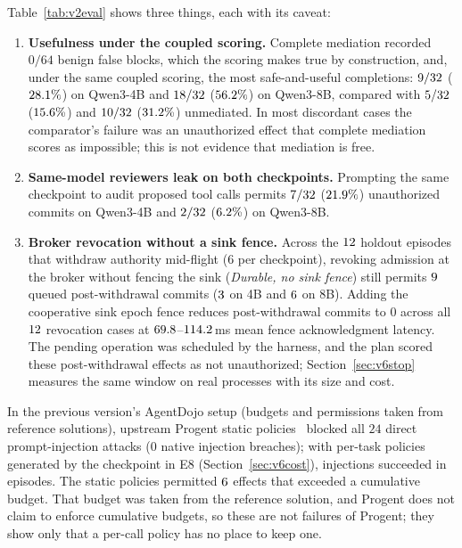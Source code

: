 Table~\ref{tab:v2eval} shows three things, each with its caveat:
\begin{enumerate}
  \item \textbf{Usefulness under the coupled scoring.} Complete mediation recorded \(0/64\) benign false blocks, which the scoring makes true by construction, and, under the same coupled scoring, the most safe-and-useful completions: \(9/32\) (\(28.1\%\)) on Qwen3-4B and \(18/32\) (\(56.2\%\)) on Qwen3-8B, compared with \(5/32\) (\(15.6\%\)) and \(10/32\) (\(31.2\%\)) unmediated. In most discordant cases the comparator's failure was an unauthorized effect that complete mediation scores as impossible; this is not evidence that mediation is free.
  \item \textbf{Same-model reviewers leak on both checkpoints.} Prompting the same checkpoint to audit proposed tool calls permits \(7/32\) (\(21.9\%\)) unauthorized commits on Qwen3-4B and \(2/32\) (\(6.2\%\)) on Qwen3-8B.
  \item \textbf{Broker revocation without a sink fence.} Across the \(12\) holdout episodes that withdraw authority mid-flight (\(6\) per checkpoint), revoking admission at the broker without fencing the sink (\emph{Durable, no sink fence}) still permits \(9\) queued post-withdrawal commits (\(3\) on 4B and \(6\) on 8B). Adding the cooperative sink epoch fence reduces post-withdrawal commits to \(0\) across all \(12\) revocation cases at \(69.8\)--\(114.2\)\,ms mean fence acknowledgment latency. The pending operation was scheduled by the harness, and the plan scored these
        post-withdrawal effects as not unauthorized; Section~\ref{sec:v6stop} measures the same window on real processes
        with its size and cost.
\end{enumerate}

In the previous version's AgentDojo setup (budgets and permissions taken from reference solutions), upstream Progent static policies~\cite{progent,progent-code} blocked all \(24\) direct prompt-injection attacks (\(0\) native injection breaches); with per-task policies generated by the checkpoint in E8 (Section~\ref{sec:v6cost}), injections succeeded in \vsixProgentNative{} episodes. The static policies permitted \(6\) effects that exceeded a cumulative budget. That budget was taken from the reference solution, and Progent does not claim to enforce cumulative budgets, so these are not failures of Progent; they show only that a per-call policy has no place to keep one.

